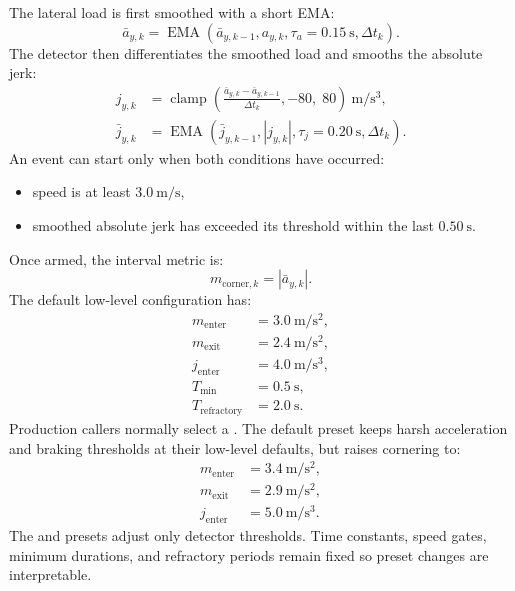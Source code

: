 \documentclass[11pt]{article}
\newcommand{\dt}{\Delta t}
\newcommand{\abs}[1]{\left|#1\right|}
\begin{document}
The lateral load is first smoothed with a short EMA:
\begin{equation}
  \bar{a}_{y,k}
    = \operatorname{EMA}(\bar{a}_{y,k-1}, a_{y,k}, \tau_a=0.15~\mathrm{s}, \dt_k).
\end{equation}
The detector then differentiates the smoothed load and smooths the absolute
jerk:
\begin{align}
  j_{y,k} &=
    \operatorname{clamp}\left(
      \frac{\bar{a}_{y,k}-\bar{a}_{y,k-1}}{\dt_k},
      -80,\;80
    \right)~\mathrm{m/s^3},\\
  \bar{j}_{y,k}
    &= \operatorname{EMA}(\bar{j}_{y,k-1}, \abs{j_{y,k}}, \tau_j=0.20~\mathrm{s}, \dt_k).
\end{align}
An event can start only when both conditions have occurred:
\begin{itemize}[nosep]
  \item speed is at least \(3.0~\mathrm{m/s}\),
  \item smoothed absolute jerk has exceeded its threshold within the last
    \(0.50~\mathrm{s}\).
\end{itemize}
Once armed, the interval metric is:
\begin{equation}
  m_{\mathrm{corner},k}=\abs{\bar{a}_{y,k}}.
\end{equation}
The default low-level configuration has:
\begin{align}
  m_{\mathrm{enter}} &= 3.0~\mathrm{m/s^2},\\
  m_{\mathrm{exit}} &= 2.4~\mathrm{m/s^2},\\
  j_{\mathrm{enter}} &= 4.0~\mathrm{m/s^3},\\
  T_{\min} &= 0.5~\mathrm{s},\\
  T_{\mathrm{refractory}} &= 2.0~\mathrm{s}.
\end{align}
Production callers normally select a . The default
 preset keeps harsh acceleration and braking thresholds at their
low-level defaults, but raises cornering to:
\begin{align}
  m_{\mathrm{enter}} &= 3.4~\mathrm{m/s^2},\\
  m_{\mathrm{exit}} &= 2.9~\mathrm{m/s^2},\\
  j_{\mathrm{enter}} &= 5.0~\mathrm{m/s^3}.
\end{align}
The  and  presets adjust only detector
thresholds. Time constants, speed gates, minimum durations, and refractory
periods remain fixed so preset changes are interpretable.
\end{document}
